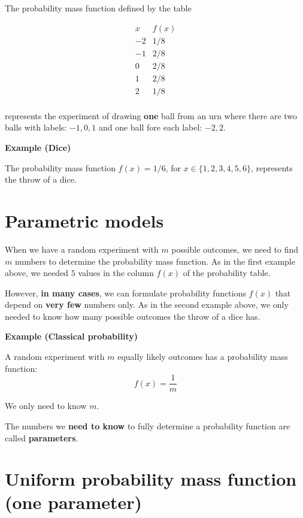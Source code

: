 \documentclass[
]{book}
\begin{document}
The probability mass function defined by the table

\[
\begin{array}{cc}
x & f(x) \\
-2 & 1/8 \\
-1 & 2/8 \\
0  & 2/8 \\
1  & 2/8 \\
2  & 1/8 \\
\end{array}
\]

represents the experiment of drawing \textbf{one} ball from an urn where there are two balls with labels: \(-1, 0, 1\) and one ball fore each label: \(-2, 2\).

\textbf{Example (Dice)}

The probability mass function \(f(x)=1/6\), for \(x\in\{1,2,3,4,5,6\}\), represents the throw of a dice.

\hypertarget{parametric-models}{%
\section{Parametric models}\label{parametric-models}}

When we have a random experiment with \(m\) possible outcomes, we need to find \(m\) numbers to determine the probability mass function. As in the first example above, we needed \(5\) values in the column \(f(x)\) of the probability table.

However, \textbf{in many cases}, we can formulate probability functions \(f(x)\) that depend on \textbf{very few} numbers only. As in the second example above, we only needed to know how many possible outcomes the throw of a dice has.

\textbf{Example (Classical probability)}

A random experiment with \(m\) equally likely outcomes has a probability mass function:
\[f(x)=\frac{1}{m}\]

We only need to know \(m\).

The numbers we \textbf{need to know} to fully determine a probability function are called \textbf{parameters}.

\hypertarget{uniform-probability-mass-function-one-parameter}{%
\section{Uniform probability mass function (one parameter)}\label{uniform-probability-mass-function-one-parameter}}
\end{document}
